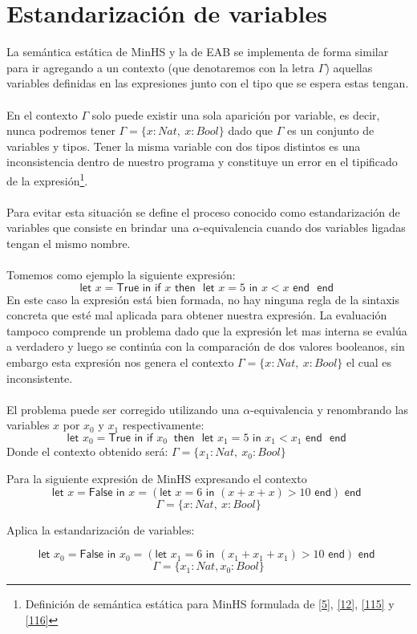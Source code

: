 \section{Estandarización de variables}
La semántica estática de \textsf{MinHS} y la de \textsf{EAB} se implementa de forma similar para ir agregando a un contexto (que denotaremos con la letra $\Gamma$) aquellas variables definidas en las expresiones junto con el tipo que se espera estas tengan.\\\\
En el contexto $\Gamma$ solo puede existir una sola aparición por variable, es decir, nunca podremos tener $\Gamma=\{x : Nat,\ x : Bool\}$ dado que $\Gamma$ es un conjunto de variables y tipos. Tener la misma variable con dos tipos distintos es una inconsistencia dentro de nuestro programa y constituye un error en el tipificado de la expresión\footnote{Definición de semántica estática para \textsf{MinHS} formulada de  \hyperlink{5}{[5]},  \hyperlink{12}{[12]}, \hyperlink{115}{[115]} y \hyperlink{116}{[116]}}.\\\\
Para evitar esta situación se define el proceso conocido como estandarización de variables que consiste en brindar una $\alpha$-equivalencia cuando dos variables ligadas tengan el mismo nombre.\\\\
Tomemos como ejemplo la siguiente expresión:
$$ \textsf{let } x = \textsf{True} \textsf{ in } \textsf{if } x \textsf{ then } \textsf{ let } x = 5 \textsf{ in } x < x \textsf{ end } \textsf{ end }$$
En este caso la expresión está bien formada, no hay ninguna regla de la sintaxis concreta que esté mal aplicada para obtener nuestra expresión. La evaluación tampoco comprende un problema dado que la expresión \textsf{let} mas interna se evalúa a verdadero y luego se continúa con la comparación de dos valores booleanos, sin embargo esta expresión nos genera el contexto $\Gamma=\{x : Nat,\ x : Bool\}$ el cual es inconsistente.\\\\
El problema puede ser corregido utilizando una $\alpha$-equivalencia y renombrando las variables $x$ por $x_0$ y $x_1$ respectivamente:
$$ \textsf{let } x_0 = \textsf{True} \textsf{ in } \textsf{if } x_0\ \textsf{ then } \textsf{ let } x_1 = 5 \textsf{ in } x_1 < x_1 \textsf{ end } \textsf{ end }$$
Donde el contexto obtenido será: $\Gamma=\{x_1 : Nat,\ x_0 : Bool\}$

\begin{exercise}
    Para la siguiente expresión de \textsf{MinHS} expresando el contexto
    $$\textsf{let } x = \textsf{False} \textsf{ in } x = (\textsf{let } x = 6 \textsf{ in } (x + x + x) > 10 \textsf{ end}) \textsf{ end }$$
    $$\Gamma=\{x : Nat,\ x : Bool\}$$
    
    Aplica la estandarización de variables:
    
    $$\textsf{let } x_0 = \textsf{False} \textsf{ in } x_0 = (\textsf{let } x_1 = 6 \textsf{ in } (x_1 + x_1 + x_1) > 10 \textsf{ end}) \textsf{ end }$$
    $$\Gamma=\{x_1 : Nat, x_0 : Bool\}$$

\end{exercise} 

